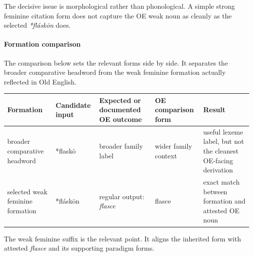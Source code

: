 \documentclass[
  british,
  a4paper,
]{article}
\newcounter{none} %
\begin{document}
The decisive issue is morphological rather than phonological. A simple
strong feminine citation form does not capture the OE weak noun as
cleanly as the selected \emph{*fláskōn} does.

\paragraph{Formation comparison}\label{formation-comparison-2}

The comparison below sets the relevant forms side by side. It separates
the broader comparative headword from the weak feminine formation
actually reflected in Old English.

{\def\LTcaptype{none} %
\begin{longtable}[]{@{}
  >{\raggedright\arraybackslash}p{}
  >{\raggedright\arraybackslash}p{}
  >{\raggedright\arraybackslash}p{}
  >{\raggedright\arraybackslash}p{}
  >{\raggedright\arraybackslash}p{}@{}}
\toprule\noalign{}
\begin{minipage}[b]{\linewidth}\raggedright
Formation
\end{minipage} & \begin{minipage}[b]{\linewidth}\raggedright
Candidate input
\end{minipage} & \begin{minipage}[b]{\linewidth}\raggedright
Expected or documented OE outcome
\end{minipage} & \begin{minipage}[b]{\linewidth}\raggedright
OE comparison form
\end{minipage} & \begin{minipage}[b]{\linewidth}\raggedright
Result
\end{minipage} \\
\midrule\noalign{}
\endhead
\bottomrule\noalign{}
\endlastfoot
broader comparative headword & *flaskō & broader family label & wider
family context & useful lexeme label, but not the cleanest OE-facing
derivation \\
selected weak feminine formation & *fláskōn & regular output:
\emph{flasce} & flasce & exact match between formation and attested OE
noun \\
\end{longtable}
}

The weak feminine suffix is the relevant point. It aligns the inherited
form with attested \emph{flasce} and its supporting paradigm forms.
\end{document}
